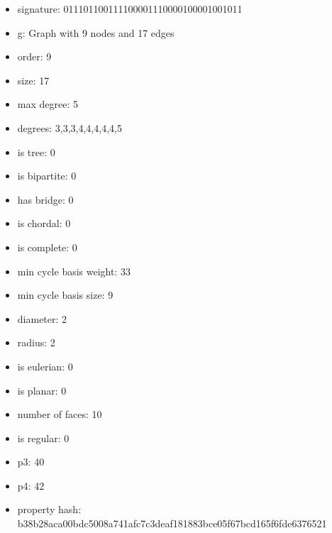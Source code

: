 \newpage
\begin{figure}
\end{figure}
\begin{itemize}
\item signature: 011101100111100001110000100001001011
\item g: Graph with 9 nodes and 17 edges
\item order: 9
\item size: 17
\item max degree: 5
\item degrees: 3,3,3,4,4,4,4,4,5
\item is tree: 0
\item is bipartite: 0
\item has bridge: 0
\item is chordal: 0
\item is complete: 0
\item min cycle basis weight: 33
\item min cycle basis size: 9
\item diameter: 2
\item radius: 2
\item is eulerian: 0
\item is planar: 0
\item number of faces: 10
\item is regular: 0
\item p3: 40
\item p4: 42
\item property hash: b38b28aca00bdc5008a741afc7c3deaf181883bce05f67bcd165f6fde6376521
\end{itemize}
